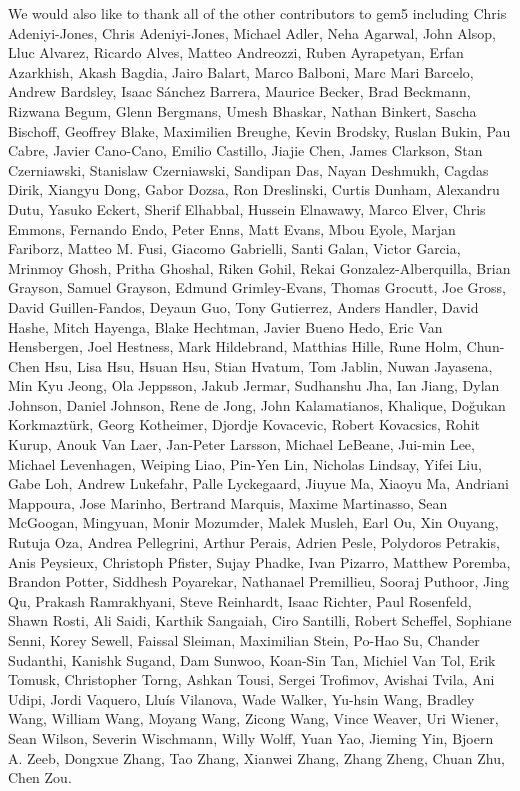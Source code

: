 \documentclass[sigconf,nonacm,screen=true]{acmart}
\begin{document}
We would also like to thank all of the other contributors to gem5 including
Chris Adeniyi-Jones, Chris Adeniyi-Jones, Michael Adler, Neha Agarwal, John Alsop, Lluc Alvarez, Ricardo Alves, Matteo Andreozzi, Ruben Ayrapetyan, Erfan Azarkhish, Akash Bagdia, Jairo Balart, Marco Balboni, Marc Mari Barcelo, Andrew Bardsley, Isaac S\'anchez Barrera, Maurice Becker, Brad Beckmann, Rizwana Begum, Glenn Bergmans, Umesh Bhaskar, Nathan Binkert, Sascha Bischoff, Geoffrey Blake, Maximilien Breughe, Kevin Brodsky, Ruslan Bukin, Pau Cabre, Javier Cano-Cano, Emilio Castillo, Jiajie Chen, James Clarkson, Stan Czerniawski, Stanislaw Czerniawski, Sandipan Das, Nayan Deshmukh, Cagdas Dirik, Xiangyu Dong, Gabor Dozsa, Ron Dreslinski, Curtis Dunham, Alexandru Dutu, Yasuko Eckert, Sherif Elhabbal, Hussein Elnawawy, Marco Elver, Chris Emmons, Fernando Endo, Peter Enns, Matt Evans, Mbou Eyole, Marjan Fariborz, Matteo M. Fusi, Giacomo Gabrielli, Santi Galan, Victor Garcia, Mrinmoy Ghosh, Pritha Ghoshal, Riken Gohil, Rekai Gonzalez-Alberquilla, Brian Grayson, Samuel Grayson, Edmund Grimley-Evans, Thomas Grocutt, Joe Gross, David Guillen-Fandos, Deyaun Guo, Tony Gutierrez, Anders Handler, David Hashe, Mitch Hayenga, Blake Hechtman, Javier Bueno Hedo, Eric Van Hensbergen, Joel Hestness, Mark Hildebrand, Matthias Hille, Rune Holm, Chun-Chen Hsu, Lisa Hsu, Hsuan Hsu, Stian Hvatum, Tom Jablin, Nuwan Jayasena, Min Kyu Jeong, Ola Jeppsson, Jakub Jermar, Sudhanshu Jha, Ian Jiang, Dylan Johnson, Daniel Johnson, Rene de Jong, John Kalamatianos, Khalique, Do\u{g}ukan Korkmazt\"urk, Georg Kotheimer, Djordje Kovacevic, Robert Kovacsics, Rohit Kurup, Anouk Van Laer, Jan-Peter Larsson, Michael LeBeane, Jui-min Lee, Michael Levenhagen, Weiping Liao, Pin-Yen Lin, Nicholas Lindsay, Yifei Liu, Gabe Loh, Andrew Lukefahr, Palle Lyckegaard, Jiuyue Ma, Xiaoyu Ma, Andriani Mappoura, Jose Marinho, Bertrand Marquis, Maxime Martinasso, Sean McGoogan, Mingyuan, Monir Mozumder, Malek Musleh, Earl Ou, Xin Ouyang, Rutuja Oza, Andrea Pellegrini, Arthur Perais, Adrien Pesle, Polydoros Petrakis, Anis Peysieux, Christoph Pfister, Sujay Phadke, Ivan Pizarro, Matthew Poremba, Brandon Potter, Siddhesh Poyarekar, Nathanael Premillieu, Sooraj Puthoor, Jing Qu, Prakash Ramrakhyani, Steve Reinhardt, Isaac Richter, Paul Rosenfeld, Shawn Rosti, Ali Saidi, Karthik Sangaiah, Ciro Santilli, Robert Scheffel, Sophiane Senni, Korey Sewell, Faissal Sleiman, Maximilian Stein, Po-Hao Su, Chander Sudanthi, Kanishk Sugand, Dam Sunwoo, Koan-Sin Tan, Michiel Van Tol, Erik Tomusk, Christopher Torng, Ashkan Tousi, Sergei Trofimov, Avishai Tvila, Ani Udipi, Jordi Vaquero, Llu\'is Vilanova, Wade Walker, Yu-hsin Wang, Bradley Wang, William Wang, Moyang Wang, Zicong Wang, Vince Weaver, Uri Wiener, Sean Wilson, Severin Wischmann, Willy Wolff, Yuan Yao, Jieming Yin, Bjoern A. Zeeb, Dongxue Zhang, Tao Zhang, Xianwei Zhang, Zhang Zheng, Chuan Zhu, Chen Zou.



\end{document}
